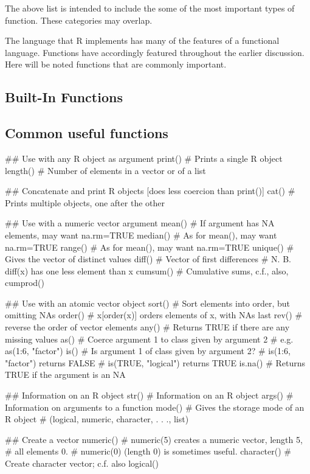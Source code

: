 \documentclass{tufte-book}\usepackage[]{graphicx}\usepackage[]{color}
\begin{document}
The above list is intended to include the some of the most important
types of function.  These categories may overlap.

The language that R implements has many of the features
of  a
functional language. Functions have accordingly featured throughout
the earlier discussion.  Here will be noted functions that are
commonly important.

\subsection{Built-In Functions}\label{ss:built-in}

\subsection*{Common useful functions}

\begin{fullwidth}
\begin{verbcode}
## Use with any R object as argument
print()           # Prints a single R object
length()          # Number of elements in a vector or of a list

## Concatenate and print R objects [does less coercion than print()]
cat()             # Prints multiple objects, one after the other

## Use with a numeric vector argument
mean()            # If argument has NA elements, may want na.rm=TRUE
median()          # As for mean(), may want na.rm=TRUE
range()           # As for mean(), may want na.rm=TRUE
unique()          # Gives the vector of distinct values
diff()            # Vector of first differences
                  # N. B. diff(x) has one less element than x
cumsum()          # Cumulative sums, c.f., also, cumprod()

## Use with an atomic vector object
sort()            # Sort elements into order, but omitting NAs
order()           # x[order(x)] orders elements of x, with NAs last
rev()             # reverse the order of vector elements
any()             # Returns TRUE if there are any missing values
as()              # Coerce argument 1 to class given by argument 2
                  # e.g. as(1:6, "factor")
is()              # Is argument 1 of class given by argument 2?
                  # is(1:6, "factor") returns FALSE
                  # is(TRUE, "logical") returns TRUE
is.na()           # Returns TRUE if the argument is an NA

## Information on an R object
str()             # Information on an R object
args()            # Information on arguments to a function
mode()            # Gives the storage mode of an R object
                  # (logical, numeric, character, . . ., list)

## Create a vector
numeric()         # numeric(5) creates a numeric vector, length 5,
                  # all elements 0.
                  # numeric(0) (length 0) is sometimes useful.
character()       # Create character vector; c.f. also logical()
\end{verbcode}
\end{fullwidth}
\end{document}
